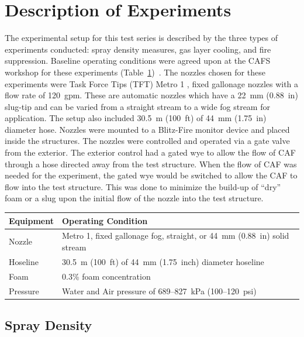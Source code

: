 \documentclass[12pt,oneside]{book}
\begin{document}
\section{Description of Experiments}
\label{sec:desc_experiments}
The experimental setup for this test series is described by the three types of experiments conducted: spray density measures, gas layer cooling, and fire suppression.  Baseline operating conditions were agreed upon at the CAFS workshop for these experiments (Table~\ref{tab:op_condition})~\cite{Grant:2011}. The nozzles chosen for these experiments were Task Force Tips (TFT) Metro 1 \textregistered, fixed gallonage nozzles with a flow rate of 120~gpm. These are automatic nozzles which have a 22~mm (0.88~in) slug-tip and can be varied from a straight stream to a wide fog stream for application. The setup also included 30.5~m (100~ft) of 44~mm (1.75~in) diameter hose. Nozzles were mounted to a Blitz-Fire \textregistered monitor device and placed inside the structures. The nozzles were controlled and operated via a gate valve from the exterior. The exterior control had a gated wye to allow the flow of CAF through a hose directed away from the test structure. When the flow of CAF was needed for the experiment, the gated wye would be switched to allow the CAF to flow into the test structure. This was done to minimize the build-up of ``dry'' foam or a slug upon the initial flow of the nozzle into the test structure.

\begin{table}[!ht]
\centering
{}\label{tab:op_condition}
\begin{tabular}{ll}
\toprule[1.5pt]
Equipment    &   Operating Condition \\
\midrule
Nozzle       & Metro 1, fixed gallonage fog, straight, or 44~mm (0.88~in) solid stream \\
Hoseline     & 30.5~m (100~ft) of 44~mm (1.75~inch) diameter hoseline \\
Foam         & 0.3\% foam concentration \\
Pressure     & Water and Air pressure of 689--827~kPa (100--120~psi) \\
\bottomrule[1.25pt]
\end{tabular}\par
\end{table}


\subsection{Spray Density}
\label{sec:desc_Spray_Density}
\end{document}
